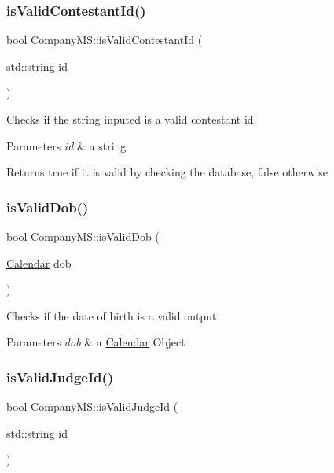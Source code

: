 \subsubsection{\texorpdfstring{is\+Valid\+Contestant\+Id()}{isValidContestantId()}}
{\footnotesize\ttfamily bool Company\+M\+S\+::is\+Valid\+Contestant\+Id (\begin{DoxyParamCaption}\item[{std\+::string}]{id }\end{DoxyParamCaption})}



Checks if the string inputed is a valid contestant id. 


\begin{DoxyParams}{Parameters}
{\em id} & a string \\
\hline
\end{DoxyParams}
\begin{DoxyReturn}{Returns}
true if it is valid by checking the database, false otherwise 
\end{DoxyReturn}
\mbox{\label{class_company_m_s_a030d1058d9196c1ac5cf1033e95e83c4}} 
\subsubsection{\texorpdfstring{is\+Valid\+Dob()}{isValidDob()}}
{\footnotesize\ttfamily bool Company\+M\+S\+::is\+Valid\+Dob (\begin{DoxyParamCaption}\item[{\hyperlink{class_calendar}{Calendar}}]{dob }\end{DoxyParamCaption})}



Checks if the date of birth is a valid output. 


\begin{DoxyParams}{Parameters}
{\em dob} & a \hyperlink{class_calendar}{Calendar} Object \\
\hline
\end{DoxyParams}
\mbox{\label{class_company_m_s_af4f06b5d99b7cdc6cdca2f98f5a844d5}} 
\subsubsection{\texorpdfstring{is\+Valid\+Judge\+Id()}{isValidJudgeId()}}
{\footnotesize\ttfamily bool Company\+M\+S\+::is\+Valid\+Judge\+Id (\begin{DoxyParamCaption}\item[{std\+::string}]{id }\end{DoxyParamCaption})}




